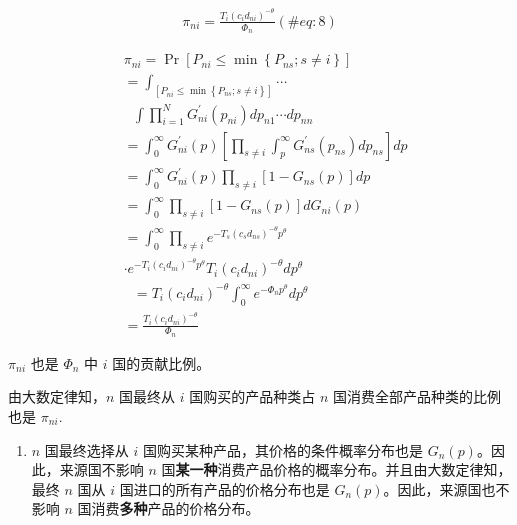 \documentclass[]{tufte-handout}
\providecommand{\tightlist}{%
  \setlength{\itemsep}{0pt}\setlength{\parskip}{0pt}}
\begin{document}
\begin{align}
\pi_{n i}=\frac{T_{i}\left(c_{i} d_{n i}\right)^{-\theta}}{\Phi_{n}}  (\#eq:8)
\end{align}

\begin{marginfigure}
\[
\begin{aligned}
&\pi_{n i}=\operatorname{Pr}\left[P_{n i} \leq \min \left\{P_{n s}; s \neq i\right\}\right] \\ 
&=\int_{\left[P_{n i} \leq \min \left\{P_{n s}; s \neq i\right\}\right]}\cdots \\
& \text {      } {\int \prod_{i=1}^{N} G_{n i}^{\prime} \left(p_{n i}\right) d p_{n 1} \cdots d p_{n n}} \\ 
&={\int_{0}^{\infty} G_{n i}^{\prime}(p)\left[\prod_{s \neq i} \int_{p}^{\infty}G_{n s}^{\prime}\left(p_{n s}\right) d p_{n s}\right] d p}\\
&={\int_{0}^{\infty} G_{n i}^{\prime}(p)\prod_{s \neq i} \left [1 - G_{n s}(p)\right] dp} \\
&=\int_{0}^{\infty} \prod_{s \neq i}\left[1-G_{n s}(p)\right] d G_{ni}(p) \\ 
&=\int_{0}^{\infty} \prod_{s \neq i}e^{ -T_{s}\left(c_{s} d_{n s}\right)^{-\theta} p^{\theta}} \\
& \cdot e^{ -T_{i}\left(c_{i} d_{n i}\right)^{-\theta} p^{\theta}} T_{i}\left(c_{i} d_{n i}\right)^{-\theta} d p^{\theta}\\
& \text {      }=T_{i}\left(c_{i} d_{n i}\right)^{-\theta}\int_{0}^{\infty} e^{ -\Phi_n p^{\theta}}  d p^{\theta}\\
&=\frac{T_{i}\left(c_{i} d_{n i}\right)^{-\theta}}{\Phi_{n}} 
\end{aligned} 
\]
\end{marginfigure}

\(\pi_{ni}\) 也是 \(\Phi_{n}\) 中 \(i\) 国的贡献比例。

由大数定律知，\(n\) 国最终从 \(i\) 国购买的产品种类占 \(n\)
国消费全部产品种类的比例也是 \(\pi_{ni}\).

\begin{enumerate}
\def\labelenumi{\arabic{enumi}.}
\setcounter{enumi}{1}
\tightlist
\item
  \(n\) 国最终选择从 \(i\) 国购买某种产品，其价格的条件概率分布也是
  \(G_{n}(p)\)。因此，来源国不影响 \(n\)
  国\textbf{某一种}消费产品价格的概率分布。并且由大数定律知，最终 \(n\)
  国从 \(i\) 国进口的所有产品的价格分布也是
  \(G_{n}(p)\)。因此，来源国也不影响 \(n\)
  国消费\textbf{多种}产品的价格分布。
\end{enumerate}
\end{document}
